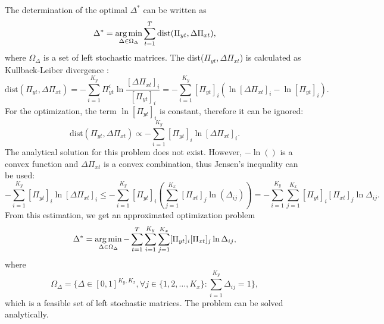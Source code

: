 The determination of the optimal $\Delta^{*}$ can be written as
\begin{equation}
    \Delta^* = \operatorname*{arg\,min}_{\Delta \in \Omega_{\Delta}} \sum_{t=1}^T \text{dist}(\Pi_{yt}, \Delta\Pi_{xt}),
\end{equation}
where $\Omega_{\Delta}$ is a set of left stochastic matrices. The dist($\Pi_{yt}, \Delta\Pi_{xt}$) is calculated as Kullback-Leiber divergence \cite{Kullback1951}:
\begin{equation}
    \text{dist}(\Pi_{yt}, \Delta\Pi_{xt}) = - \sum_{i=1}^{K_y} \Pi_{yt}^i \ln\frac{[\Delta\Pi_{xt}]_i}{[\Pi_{yt}]_i} = - \sum_{i=1}^{K_y} [\Pi_{yt}]_i (\ln [\Delta\Pi_{xt}]_i - \ln [\Pi_{yt}]_i).
\end{equation}
For the optimization, the term $\ln [\Pi_{yt}]_i$ is constant, therefore it can be ignored:
\begin{equation}
    \text{dist}(\Pi_{yt}, \Delta\Pi_{xt}) \propto - \sum_{i=1}^{K_y} [\Pi_{yt}]_i \ln [\Delta\Pi_{xt}]_i.
\end{equation}
The analytical solution for this problem does not exist. However, $-\ln()$ is a convex function and $\Delta\Pi_{xt}$ is a convex combination, thus Jensen's inequality can be used:
\begin{equation}
    - \sum_{i=1}^{K_y} [\Pi_{yt}]_i \ln [\Delta\Pi_{xt}]_i \leq - \sum_{i=1}^{K_y} [\Pi_{yt}]_i ( \sum_{j=1}^{K_x} [\Pi_{xt}]_j \ln (\Delta_{ij}) ) = - \sum_{i=1}^{K_y} \sum_{j=1}^{K_x} [\Pi_{yt}]_i [\Pi_{xt}]_j \ln \Delta_{ij}.
\end{equation}
From this estimation, we get an approximated optimization problem
\begin{equation}
    \Delta^* = \operatorname*{arg\,min}_{\Delta \in \Omega_{\Delta}} - \sum_{t=1}^T \sum_{i=1}^{K_y} \sum_{j=1}^{K_x} [\Pi_{yt}]_i [\Pi_{xt}]_j \ln \Delta_{ij},
\end{equation}
where
\begin{equation}
    \Omega_{\Delta} = \{ \Delta \in [0, 1]^{K_y,K_x}, \forall j \in \{ 1, 2, \dots, K_x \} : \sum_{i=1}^{K_y} \Delta_{ij} = 1 \},
\end{equation}
which is a feasible set of left stochastic matrices. The problem can be solved analytically.


